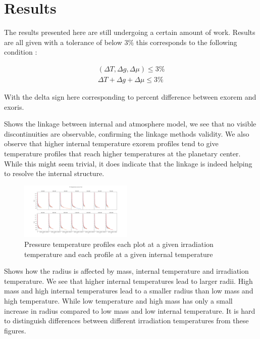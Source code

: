 \section{Results}
The results presented here are still undergoing a certain amount of work. Results are all given with a tolerance of below $3\%$ this corresponds to the following condition :

\begin{align} 
    (\Delta T, \Delta g, \Delta \mu) \leq 3\% \\
    \Delta T + \Delta g + \Delta \mu \leq 3\%
\end{align}

With the delta sign here corresponding to percent difference between exorem and exoris.\par

 Shows the linkage between internal and atmosphere model, we see that no visible discontinuities are observable, confirming the linkage methods validity. We also observe that higher internal temperature exorem profiles tend to give temperature profiles that reach higher temperatures at the planetary center. While this might seem trivial, it does indicate that the linkage is indeed helping to resolve the internal structure.\par

\begin{figure}
    \centering
    \includegraphics[width=0.48\textwidth]{Images/P_T.png}
    \caption{Pressure temperature profiles each plot at a given irradiation temperature and each profile at a given internal temperature}
    \label{fig:P_T}
\end{figure}

 Shows how the radius is affected by mass, internal temperature and irradiation temperature. We see that higher internal temperatures lead to larger radii. High mass and high internal temperatures lead to a smaller radius than low mass and high temperature. While low temperature and high mass has only a small increase in radius compared to low mass and low internal temperature. It is hard to distinguish differences between different irradiation temperatures from these figures. \par

